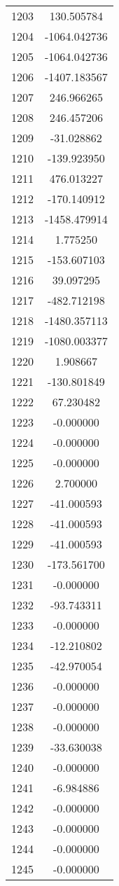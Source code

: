 \documentclass[12pt]{article}
\begin{document}
\begin{longtable}{@{}cc@{}}
1203 & 130.505784 \\
1204 & -1064.042736 \\
1205 & -1064.042736 \\
1206 & -1407.183567 \\
1207 & 246.966265 \\
1208 & 246.457206 \\
1209 & -31.028862 \\
1210 & -139.923950 \\
1211 & 476.013227 \\
1212 & -170.140912 \\
1213 & -1458.479914 \\
1214 & 1.775250 \\
1215 & -153.607103 \\
1216 & 39.097295 \\
1217 & -482.712198 \\
1218 & -1480.357113 \\
1219 & -1080.003377 \\
1220 & 1.908667 \\
1221 & -130.801849 \\
1222 & 67.230482 \\
1223 & -0.000000 \\
1224 & -0.000000 \\
1225 & -0.000000 \\
1226 & 2.700000 \\
1227 & -41.000593 \\
1228 & -41.000593 \\
1229 & -41.000593 \\
1230 & -173.561700 \\
1231 & -0.000000 \\
1232 & -93.743311 \\
1233 & -0.000000 \\
1234 & -12.210802 \\
1235 & -42.970054 \\
1236 & -0.000000 \\
1237 & -0.000000 \\
1238 & -0.000000 \\
1239 & -33.630038 \\
1240 & -0.000000 \\
1241 & -6.984886 \\
1242 & -0.000000 \\
1243 & -0.000000 \\
1244 & -0.000000 \\
1245 & -0.000000 \\

\end{longtable}
\end{document}

